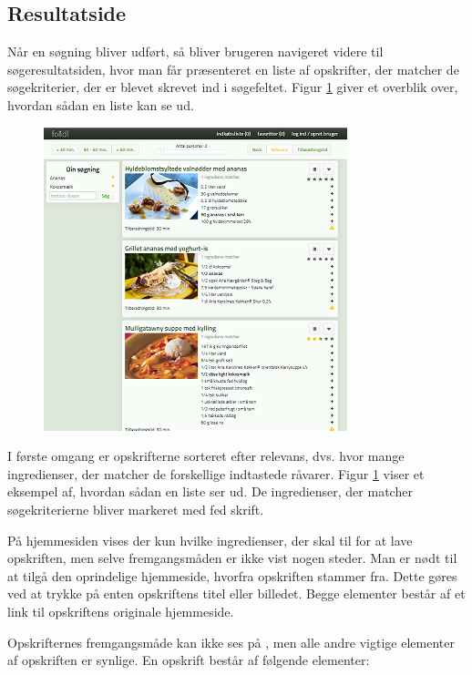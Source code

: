 \subsection{Resultatside}
\label{subsec:brug-resultat}

Når en søgning bliver udført, så bliver brugeren navigeret videre til søgeresultatsiden, hvor man får præsenteret en liste af opskrifter, der matcher de søgekriterier, der er blevet skrevet ind i søgefeltet. Figur \ref{fig:overblik-resultat} giver et overblik over, hvordan sådan en liste kan se ud.

\begin{figure}[h]
	\centering
	\includegraphics[scale=1]{billeder/foodl/thumbnails/soegeresultat.png}
	\label{fig:overblik-resultat}
\end{figure}

I første omgang er opskrifterne sorteret efter relevans, dvs. hvor mange ingredienser, der matcher de forskellige indtastede råvarer. Figur \ref{fig:overblik-resultat} viser et eksempel af, hvordan sådan en liste ser ud. De ingredienser, der matcher søgekriterierne bliver markeret med fed skrift. 

På hjemmesiden vises der kun hvilke ingredienser, der skal til for at lave opskriften, men selve fremgangsmåden er ikke vist nogen steder. Man er nødt til at tilgå den oprindelige hjemmeside, hvorfra opskriften stammer fra. Dette gøres ved at trykke på enten opskriftens titel eller billedet. Begge elementer består af et link til opskriftens originale hjemmeside. 

Opskrifternes fremgangsmåde kan ikke ses på \Foodl{}, men alle andre vigtige elementer af opskriften er synlige. En opskrift består af følgende elementer:

